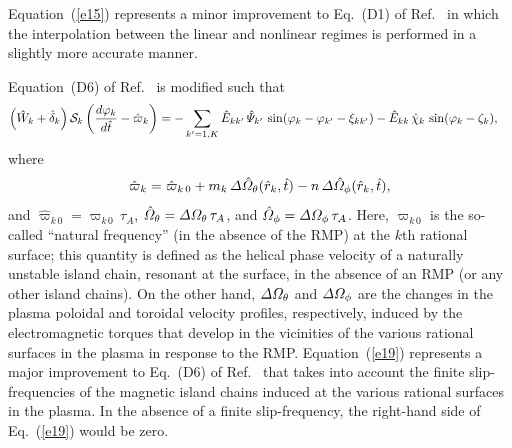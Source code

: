 \documentclass[12pt,prb,aps]{revtex4-1}
\begin{document}
Equation~(\ref{e15}) represents a minor improvement to Eq.~(D1) of Ref.~ in which the interpolation between the
linear and nonlinear regimes is performed in a slightly more accurate manner. 

Equation~(D6) of Ref.~ is modified such that
\begin{align}\label{e19}
\left(\hat{W}_k +\hat{\delta}_k\right){\cal S}_k\left(\frac{d\varphi_k}{d\hat{t}}-\hat{\varpi}_k\right)&=
- \sum_{k'=1,K}\hat{E}_{kk'}\,\hat{\mit\Psi}_{k'}\,\sin(\varphi_k-\varphi_{k'}-\xi_{kk'})-\hat{E}_{kk}\,\hat{\chi}_k\,\sin(\varphi_k-\zeta_k),
\end{align}
where
\begin{equation}
\hat{\varpi}_k= \hat{\varpi}_{k\,0}+m_k\,{\mit\Delta}\hat{\mit\Omega}_\theta(\hat{r}_k,\hat{t})-n\,{\mit\Delta}\hat{\mit\Omega}_\phi(\hat{r}_k,\hat{t}),
\end{equation}
and $\hat{\varpi}_{k\,0}= \varpi_{k\,0}\,\tau_A$, $\hat{\mit\Omega}_\theta= {\mit\Delta}{\mit\Omega}_\theta\,\tau_A$, and $\hat{\mit\Omega}_\phi= {\mit\Delta}{\mit\Omega}_\phi\,\tau_A$. Here, $\varpi_{k\,0}$
is the so-called ``natural frequency''  (in the absence of the RMP) at the $k$th rational surface; this quantity is defined as the helical phase velocity of a naturally unstable island chain, resonant at the surface, in the
absence of an RMP (or any other island chains). On the other hand,  ${\mit\Delta}{\mit\Omega}_\theta$ and ${\mit\Delta}{\mit\Omega}_\phi$ are the changes in the plasma
poloidal and toroidal velocity profiles, respectively, induced by the electromagnetic torques that develop in the vicinities of the various rational surfaces in the plasma in response to the RMP.
Equation~(\ref{e19}) represents
a major improvement to Eq.~(D6) of Ref.~ that takes into  account the finite slip-frequencies of the magnetic island chains induced at
the various rational surfaces in the plasma. In the absence of a finite slip-frequency, the right-hand side of Eq.~(\ref{e19}) would be zero. 
\end{document}
